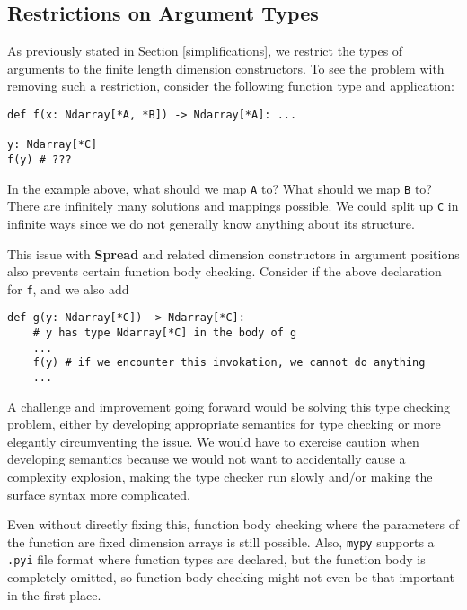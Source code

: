 \documentclass[12pt]{report}
\begin{document}
\subsection{Restrictions on Argument Types}

As previously stated in Section \ref{simplifications}, we restrict the types of arguments to the finite length dimension constructors. To see the problem with removing such a restriction, consider the following function type and application:

\begin{singlespace*}
    \begin{verbatim}
def f(x: Ndarray[*A, *B]) -> Ndarray[*A]: ...

y: Ndarray[*C]
f(y) # ???\end{verbatim}
\end{singlespace*}
In the example above, what should we map \texttt{A} to? What should we map \texttt{B} to? There are infinitely many solutions and mappings possible. We could split up \texttt{C} in infinite ways since we do not generally know anything about its structure.

This issue with \textbf{Spread} and related dimension constructors in argument positions also prevents certain function body checking. Consider if the above declaration for \texttt{f}, and we also add

\begin{singlespace*}
    \begin{verbatim}
def g(y: Ndarray[*C]) -> Ndarray[*C]:
    # y has type Ndarray[*C] in the body of g
    ...
    f(y) # if we encounter this invokation, we cannot do anything
    ...\end{verbatim}

\end{singlespace*}
A challenge and improvement going forward would be solving this type checking problem, either by developing appropriate semantics for type checking or more elegantly circumventing the issue. We would have to exercise caution when developing semantics because we would not want to accidentally cause a complexity explosion, making the type checker run slowly and/or making the surface syntax more complicated.

Even without directly fixing this, function body checking where the parameters of the function are fixed dimension arrays is still possible. Also, \texttt{mypy} supports a \texttt{.pyi} file format where function types are declared, but the function body is completely omitted, so function body checking might not even be that important in the first place.
\end{document}
